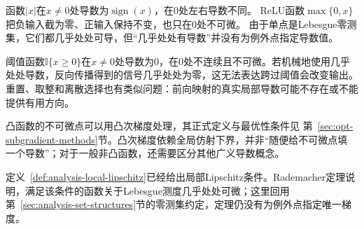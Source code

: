 函数$|x|$在$x\neq0$处导数为$\operatorname{sign}(x)$，在$0$处左右导数不同。
ReLU函数$\max\{0,x\}$把负输入截为零、正输入保持不变，也只在$0$处不可微。
由于单点是Lebesgue零测集，它们都几乎处处可导，但“几乎处处有导数”并没有为例外点指定导数值。

阈值函数$\mathbb{I}\{x\geq0\}$在$x\neq0$处导数为$0$，在$0$处不连续且不可微。若机械地使用几乎处处导数，反向传播得到的信号几乎处处为零，这无法表达跨过阈值会改变输出。重置、取整和离散选择也有类似问题：前向映射的真实局部导数可能不存在或不能提供有用方向。

凸函数的不可微点可以用凸次梯度处理，其正式定义与最优性条件见
第~\ref{sec:opt-subgradient-methods}节。凸次梯度依赖全局仿射下界，并非“随便给不可微点填
一个导数”；对于一般非凸函数，还需要区分其他广义导数概念。

定义~\ref{def:analysis-local-lipschitz}已经给出局部Lipschitz条件。Rademacher定理说明，满足该条件的函数关于Lebesgue测度几乎处处可微；这里回用第~\ref{sec:analysis-set-structures}节的零测集约定，定理仍没有为例外点指定唯一梯度。

